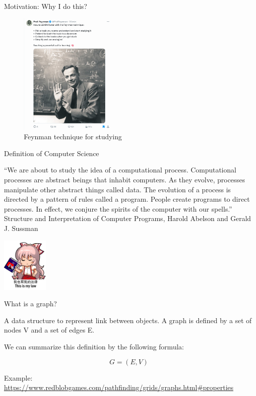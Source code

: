 \documentclass[ignorenonframetext,]{beamer}
\begin{document}
\begin{frame}{Motivation: Why I do this?}
\protect\hypertarget{motivation-why-i-do-this}{}

\begin{figure}
\centering
\includegraphics[width=\textwidth,height=2.34375in]{feynman-technique.png}
\caption{Feynman technique for studying}
\end{figure}

\end{frame}

\begin{frame}{Definition of Computer Science}
\protect\hypertarget{definition-of-computer-science}{}

``We are about to study the idea of a computational process.
Computational processes are abstract beings that inhabit computers. As
they evolve, processes manipulate other abstract things called data. The
evolution of a process is directed by a pattern of rules called a
program. People create programs to direct processes. In effect, we
conjure the spirits of the computer with our spells.'' Structure and
Interpretation of Computer Programs, Harold Abelson and Gerald J.
Sussman

\includegraphics[width=\textwidth,height=1.04167in]{Fujiwara_No_Mokou_Law_Is_SICP.png}

\end{frame}

\begin{frame}{What is a graph?}
\protect\hypertarget{what-is-a-graph}{}

A data structure to represent link between objects. A graph is defined
by a set of nodes V and a set of edges E.

We can summarize this definition by the following formula:

\[
G = (E, V)
\]

Example:
\url{https://www.redblobgames.com/pathfinding/grids/graphs.html\#properties}

\end{frame}
\end{document}
